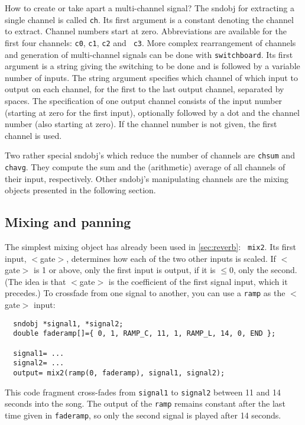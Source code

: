 \documentclass{article}
\def\bv{\begin{verbatim}}
\begin{document}
How to create or take apart a multi-channel signal?  The sndobj for extracting
a single channel is called {\tt ch}.  Its first argument is a constant denoting
the channel to extract.  Channel numbers start at zero.  Abbreviations are
available for the first four channels: {\tt c0}, {\tt c1}, {\tt c2} and {\tt
c3}.  More complex rearrangement of channels and generation of multi-channel
signals can be done with {\tt switchboard}.  Its first argument is a string
giving the switching to be done and is followed by a variable number of inputs.
The string argument specifies which channel of which input to output on each
channel, for the first to the last output channel, separated by spaces.  The
specification of one output channel consists of the input number (starting at
zero for the first input), optionally followed by a dot and the channel number
(also starting at zero).  If the channel number is not given, the first channel
is used.

Two rather special sndobj's which reduce the number of channels are {\tt chsum}
and {\tt chavg}.  They compute the sum and the (arithmetic) average of all
channels of their input, respectively.  Other sndobj's manipulating channels
are the mixing objects presented in the following section.


\subsection{Mixing and panning}

The simplest mixing object has already been used in \autoref{sec:reverb}:  {\tt
mix2}.  Its first input, $<$gate$>$, determines how each of the two other
inputs is scaled.  If $<$gate$>$ is 1 or above, only the first input is output, if it is $\le0$, only the second.  (The idea is that $<$gate$>$ is the coefficient of the first signal input, which it precedes.)  To crossfade from one signal to another, you can use a {\tt ramp} as the $<$gate$>$ input:

\bv
  sndobj *signal1, *signal2;
  double faderamp[]={ 0, 1, RAMP_C, 11, 1, RAMP_L, 14, 0, END };

  signal1= ...
  signal2= ...
  output= mix2(ramp(0, faderamp), signal1, signal2);
\end{verbatim}

This code fragment cross-fades from {\tt signal1} to {\tt signal2} between 11
and 14 seconds into the song.  The output of the {\tt ramp} remains constant
after the last time given in {\tt faderamp}, so only the second signal is
played after 14 seconds.
\end{document}

